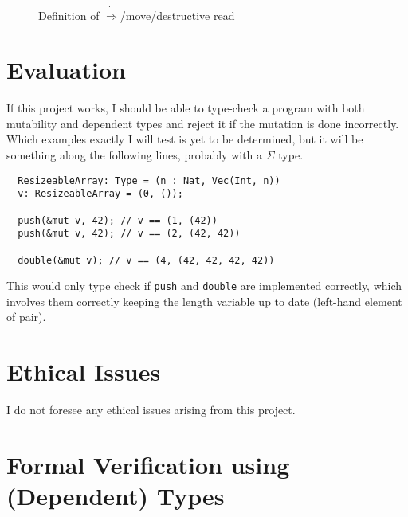 \documentclass[12pt,twoside]{report}
\begin{document}
\begin{figure}
\begin{adjustwidth}{-2cm}{-2cm}
\begin{mathpar}

  \end{mathpar}
  \end{adjustwidth}
  \caption{Definition of $\dot{\Rightarrow}$/move/destructive read}
  \label{fig:proj}
\end{figure}

\chapter{Evaluation}
If this project works, I should be able to type-check a program with both mutability and dependent types and reject it if the mutation is done incorrectly. Which examples exactly I will test is yet to be determined, but it will be something along the following lines, probably with a $\Sigma$ type.

\begin{lstlisting}
  ResizeableArray: Type = (n : Nat, Vec(Int, n))
  v: ResizeableArray = (0, ());

  push(&mut v, 42); // v == (1, (42))
  push(&mut v, 42); // v == (2, (42, 42))

  double(&mut v); // v == (4, (42, 42, 42, 42))
\end{lstlisting}

This would only type check if \verb|push| and \verb|double| are implemented correctly, which involves them correctly keeping the length variable up to date (left-hand element of pair).

\chapter{Ethical Issues}
I do not foresee any ethical issues arising from this project.




\appendix 
{}

\chapter{Formal Verification using (Dependent) Types}
\label{verificationwithtypes}
\end{document}
